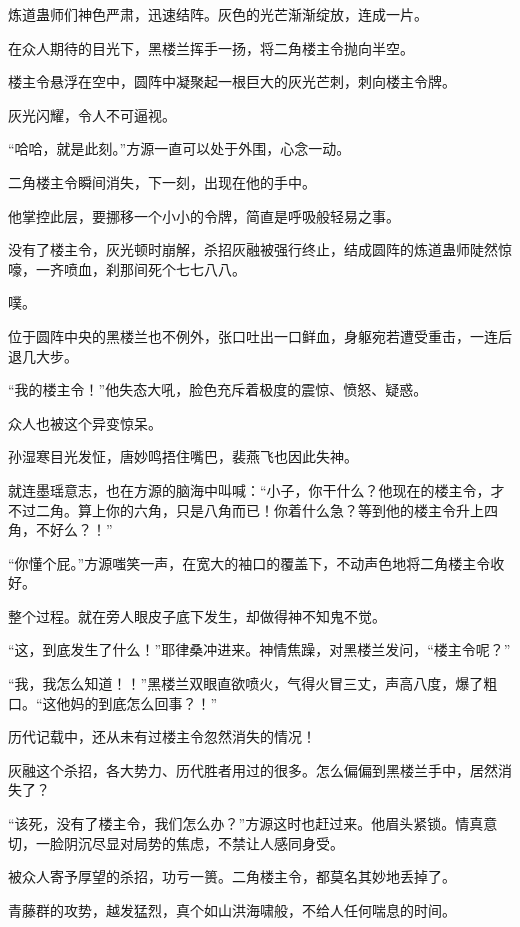 
\begin{this_body}

炼道蛊师们神色严肃，迅速结阵。灰色的光芒渐渐绽放，连成一片。

在众人期待的目光下，黑楼兰挥手一扬，将二角楼主令抛向半空。

楼主令悬浮在空中，圆阵中凝聚起一根巨大的灰光芒刺，刺向楼主令牌。

灰光闪耀，令人不可逼视。

“哈哈，就是此刻。”方源一直可以处于外围，心念一动。

二角楼主令瞬间消失，下一刻，出现在他的手中。

他掌控此层，要挪移一个小小的令牌，简直是呼吸般轻易之事。

没有了楼主令，灰光顿时崩解，杀招灰融被强行终止，结成圆阵的炼道蛊师陡然惊嚎，一齐喷血，刹那间死个七七八八。

噗。

位于圆阵中央的黑楼兰也不例外，张口吐出一口鲜血，身躯宛若遭受重击，一连后退几大步。

“我的楼主令！”他失态大吼，脸色充斥着极度的震惊、愤怒、疑惑。

众人也被这个异变惊呆。

孙湿寒目光发怔，唐妙鸣捂住嘴巴，裴燕飞也因此失神。

就连墨瑶意志，也在方源的脑海中叫喊：“小子，你干什么？他现在的楼主令，才不过二角。算上你的六角，只是八角而已！你着什么急？等到他的楼主令升上四角，不好么？！”

“你懂个屁。”方源嗤笑一声，在宽大的袖口的覆盖下，不动声色地将二角楼主令收好。

整个过程。就在旁人眼皮子底下发生，却做得神不知鬼不觉。

“这，到底发生了什么！”耶律桑冲进来。神情焦躁，对黑楼兰发问，“楼主令呢？”

“我，我怎么知道！！”黑楼兰双眼直欲喷火，气得火冒三丈，声高八度，爆了粗口。“这他妈的到底怎么回事？！”

历代记载中，还从未有过楼主令忽然消失的情况！

灰融这个杀招，各大势力、历代胜者用过的很多。怎么偏偏到黑楼兰手中，居然消失了？

“该死，没有了楼主令，我们怎么办？”方源这时也赶过来。他眉头紧锁。情真意切，一脸阴沉尽显对局势的焦虑，不禁让人感同身受。

被众人寄予厚望的杀招，功亏一篑。二角楼主令，都莫名其妙地丢掉了。

青藤群的攻势，越发猛烈，真个如山洪海啸般，不给人任何喘息的时间。


\end{this_body}
